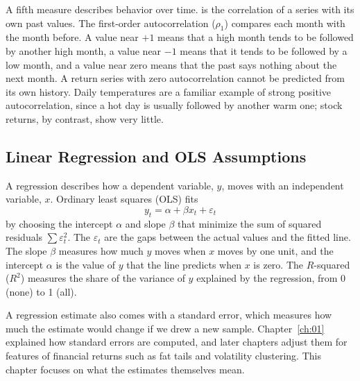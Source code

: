 A fifth measure describes behavior over time.  is the correlation of a series with its own past values. The first-order autocorrelation ($\rho_1$) compares each month with the month before. A value near $+1$ means that a high month tends to be followed by another high month, a value near $-1$ means that it tends to be followed by a low month, and a value near zero means that the past says nothing about the next month. A return series with zero autocorrelation cannot be predicted from its own history. Daily temperatures are a familiar example of strong positive autocorrelation, since a hot day is usually followed by another warm one; stock returns, by contrast, show very little.


\subsection{Linear Regression and OLS Assumptions}
\label{sec:04-regression}
A regression describes how a dependent variable, $y$, moves with an independent variable, $x$. Ordinary least squares (OLS) fits
\begin{equation}
  y_t = \alpha + \beta x_t + \varepsilon_t
  \label{eq:04-ols}
\end{equation}
by choosing the intercept $\alpha$ and slope $\beta$ that minimize the sum of squared residuals $\sum \varepsilon_t^2$. The  $\varepsilon_t$ are the gaps between the actual values and the fitted line. The slope $\beta$ measures how much $y$ moves when $x$ moves by one unit, and the intercept $\alpha$ is the value of $y$ that the line predicts when $x$ is zero. The $R$-squared ($R^2$) measures the share of the variance of $y$ explained by the regression, from 0 (none) to 1 (all).

A regression estimate also comes with a standard error, which measures how much the estimate would change if we drew a new sample. Chapter~\ref{ch:01} explained how standard errors are computed, and later chapters adjust them for features of financial returns such as fat tails and volatility clustering. This chapter focuses on what the estimates themselves mean.

